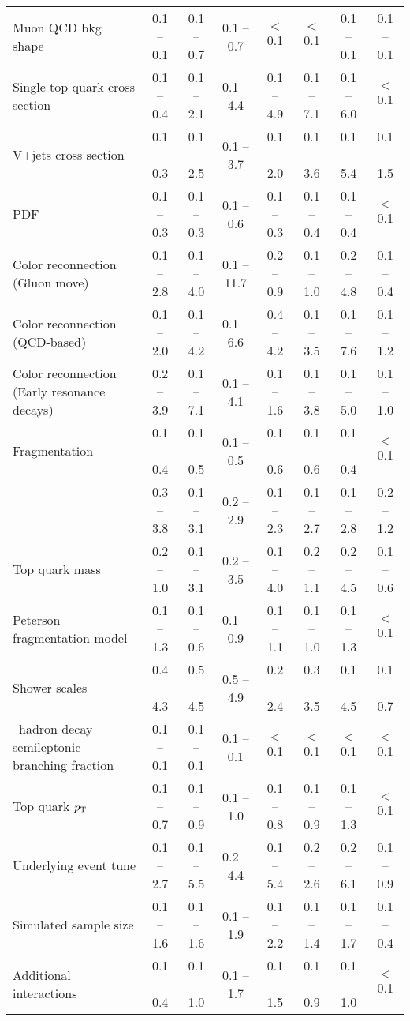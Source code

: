 \begin{landscape}
\begin{table}
{\begin{tabular}{lccccccc}
		Muon QCD bkg shape	&	0.1 -- 0.1	&	0.1 -- 0.7	&	0.1 -- 0.7	&	$<$0.1	&	$<$0.1	&	0.1 -- 0.1	&	0.1 -- 0.1\\ 
		Single top quark cross section	&	0.1 -- 0.4	&	0.1 -- 2.1	&	0.1 -- 4.4	&	0.1 -- 4.9	&	0.1 -- 7.1	&	0.1 -- 6.0	&	$<$0.1\\ 
		V+jets cross section	&	0.1 -- 0.3	&	0.1 -- 2.5	&	0.1 -- 3.7	&	0.1 -- 2.0	&	0.1 -- 3.6	&	0.1 -- 5.4	&	0.1 -- 1.5\\ 
		PDF 	&	0.1 -- 0.3	&	0.1 -- 0.3	&	0.1 -- 0.6	&	0.1 -- 0.3	&	0.1 -- 0.4	&	0.1 -- 0.4	&	$<$0.1\\ 
		Color reconnection (Gluon move)	&	0.1 -- 2.8	&	0.1 -- 4.0	&	0.1 -- 11.7	&	0.2 -- 0.9	&	0.1 -- 1.0	&	0.2 -- 4.8	&	0.1 -- 0.4\\ 
		Color reconnection (QCD-based)	&	0.1 -- 2.0	&	0.1 -- 4.2	&	0.1 -- 6.6	&	0.4 -- 4.2	&	0.1 -- 3.5	&	0.1 -- 7.6	&	0.1 -- 1.2\\ 
		Color reconnection (Early resonance decays)	&	0.2 -- 3.9	&	0.1 -- 7.1	&	0.1 -- 4.1	&	0.1 -- 1.6	&	0.1 -- 3.8	&	0.1 -- 5.0	&	0.1 -- 1.0\\ 
		Fragmentation	&	0.1 -- 0.4	&	0.1 -- 0.5	&	0.1 -- 0.5	&	0.1 -- 0.6	&	0.1 -- 0.6	&	0.1 -- 0.4	&	$<$0.1\\ 
		\hdamp{}	&	0.3 -- 3.8	&	0.1 -- 3.1	&	0.2 -- 2.9	&	0.1 -- 2.3	&	0.1 -- 2.7	&	0.1 -- 2.8	&	0.2 -- 1.2\\ 
		Top quark mass	&	0.2 -- 1.0	&	0.1 -- 3.1	&	0.2 -- 3.5	&	0.1 -- 4.0	&	0.2 -- 1.1	&	0.2 -- 4.5	&	0.1 -- 0.6\\ 
		Peterson fragmentation model	&	0.1 -- 1.3	&	0.1 -- 0.6	&	0.1 -- 0.9	&	0.1 -- 1.1	&	0.1 -- 1.0	&	0.1 -- 1.3	&	$<$0.1\\ 
		Shower scales	&	0.4 -- 4.3	&	0.5 -- 4.5	&	0.5 -- 4.9	&	0.2 -- 2.4	&	0.3 -- 3.5	&	0.1 -- 4.5	&	0.1 -- 0.7\\ 
		\bquark{}\ hadron decay semileptonic branching fraction	&	0.1 -- 0.1	&	0.1 -- 0.1	&	0.1 -- 0.1	&	$<$0.1	&	$<$0.1	&	$<$0.1	&	$<$0.1\\ 
		Top quark \ensuremath{\pt{}}	&	0.1 -- 0.7	&	0.1 -- 0.9	&	0.1 -- 1.0	&	0.1 -- 0.8	&	0.1 -- 0.9	&	0.1 -- 1.3	&	$<$0.1\\ 
		Underlying event tune	&	0.1 -- 2.7	&	0.1 -- 5.5	&	0.2 -- 4.4	&	0.1 -- 5.4	&	0.2 -- 2.6	&	0.2 -- 6.1	&	0.1 -- 0.9\\ 
		Simulated sample size	&	0.1 -- 1.6	&	0.1 -- 1.6	&	0.1 -- 1.9	&	0.1 -- 2.2	&	0.1 -- 1.4	&	0.1 -- 1.7	&	0.1 -- 0.4\\ 
		Additional interactions	&	0.1 -- 0.4	&	0.1 -- 1.0	&	0.1 -- 1.7	&	0.1 -- 1.5	&	0.1 -- 0.9	&	0.1 -- 1.0	&	$<$0.1\\ 

\end{tabular}}
\end{table}
\end{landscape}
